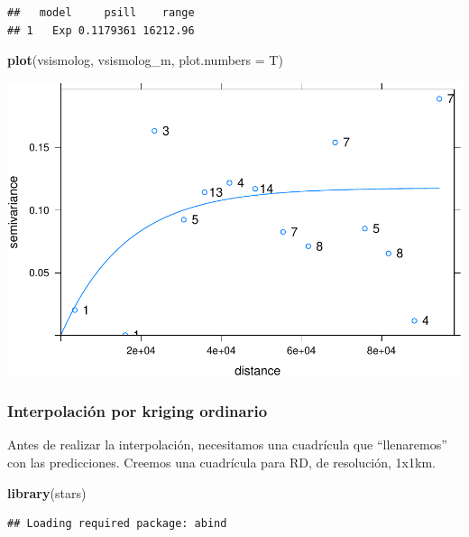 \documentclass[11pt,]{article}
\newenvironment{Shaded}{\begin{snugshade}}{\end{snugshade}}
\newcommand{\KeywordTok}[1]{\textcolor[rgb]{0.13,0.29,0.53}{\textbf{#1}}}
\newcommand{\DataTypeTok}[1]{\textcolor[rgb]{0.13,0.29,0.53}{#1}}
\newcommand{\DecValTok}[1]{\textcolor[rgb]{0.00,0.00,0.81}{#1}}
\newcommand{\StringTok}[1]{\textcolor[rgb]{0.31,0.60,0.02}{#1}}
\newcommand{\CommentTok}[1]{\textcolor[rgb]{0.56,0.35,0.01}{\textit{#1}}}
\newcommand{\OperatorTok}[1]{\textcolor[rgb]{0.81,0.36,0.00}{\textbf{#1}}}
\newcommand{\NormalTok}[1]{#1}
\begin{document}
\begin{verbatim}
##   model     psill    range
## 1   Exp 0.1179361 16212.96
\end{verbatim}

\begin{Shaded}
\begin{Highlighting}[]
\KeywordTok{plot}\NormalTok{(vsismolog, vsismolog_m, }\DataTypeTok{plot.numbers =}\NormalTok{ T)}
\end{Highlighting}
\end{Shaded}

\includegraphics{proyecto_files/figure-latex/unnamed-chunk-26-3.pdf}

\subsubsection{Interpolación por kriging
ordinario}\label{interpolaciuxf3n-por-kriging-ordinario-1}

Antes de realizar la interpolación, necesitamos una cuadrícula que
``llenaremos'' con las predicciones. Creemos una cuadrícula para RD, de
resolución, 1x1km.

\begin{Shaded}
\begin{Highlighting}[]
\KeywordTok{library}\NormalTok{(stars)}
\end{Highlighting}
\end{Shaded}

\begin{verbatim}
## Loading required package: abind
\end{verbatim}

\begin{Shaded}
\end{Shaded}
\end{document}
